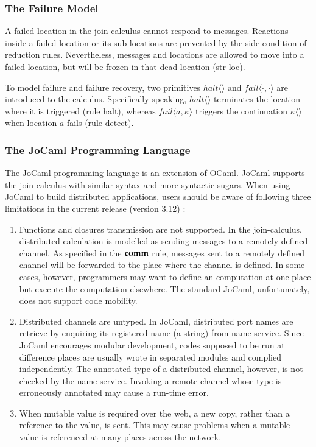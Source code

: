 \subsubsection{The Failure Model}
A failed location in the join-calculus cannot respond to messages.  Reactions inside a failed location or its sub-locations are prevented by the side-condition of reduction rules.  Nevertheless, messages and locations are allowed to move into a failed location, but will be frozen in that dead location (str-loc).

To model failure and failure recovery, two primitives $halt\langle\rangle$ and $fail\langle \cdot, \cdot \rangle$ are introduced to the calculus.  Specifically speaking, $halt\langle\rangle$ terminates the location where it is triggered (rule halt), whereas $fail\langle a,\kappa \rangle$ triggers the continuation $\kappa\langle\rangle$ when location $a$ fails (rule detect).  

\subsubsection{The JoCaml Programming Language}

The JoCaml programming language is an extension of OCaml.  JoCaml supports the join-calculus with similar syntax and more syntactic sugars.  When using JoCaml to build distributed applications, users should be aware of following three limitations in the current release (version 3.12) \citep{jocaml_lan}:
\begin{enumerate} [1.]
  \item Functions and closures transmission are not supported.  In the join-calculus, distributed calculation is modelled as sending messages to a remotely defined channel.  As specified in the $\bf{comm}$ rule, messages sent to a remotely defined channel will be forwarded to the place where the channel is defined.  In some cases, however, programmers may want to define an computation at one place but execute the computation elsewhere.  The standard JoCaml, unfortunately, does not support code mobility.
  \item Distributed channels are untyped.  In JoCaml, distributed port names are retrieve by enquiring its registered name (a string) from name service.  Since JoCaml encourages modular development, codes supposed to be run at difference places are usually wrote in separated modules and complied independently.  The annotated type of a distributed channel, however, is not checked by the name service.  Invoking a remote channel whose type is erroneously annotated may cause a run-time error.
  \item  When mutable value is required over the web, a new copy, rather than a reference to the value, is sent.  This may cause problems when a mutable value is referenced at many places across the network.
\end{enumerate}